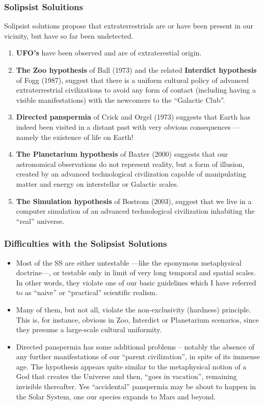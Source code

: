 \begin{frame}
\frametitle{Solipsist Soluitions}

Solipsist solutions propose that extraterrestrials are or have been present in our vicinity, but have so far been undetected. 

\begin{enumerate}
\item {\bf UFO's} have been observed and are of extraterestial origin. 
\item {\bf The Zoo hypothesis} of Ball (1973) and the related {\bf Interdict hypothesis} of Fogg (1987), suggest that there is a uniform cultural policy of advanced extraterrestrial civilizations to avoid any form of contact (including having a visible manifestations) with the newcomers to the ``Galactic Club''.
\item {\bf Directed panspermia} of Crick and Orgel (1973) suggests that Earth has indeed been visited in a distant past with very obvious consequences ---namely the existence of life on Earth! 
\item {\bf The Planetarium hypothesis} of Baxter (2000) suggests that our astronomical observations do not represent reality, but a form of illusion, created by an advanced technological civilization capable of manipulating matter and energy on interstellar or Galactic scales.
\item {\bf The Simulation hypothesis} of Bostrom (2003), suggest that we live in a computer simulation of an advanced technological civilization inhabiting the ``real'' universe.
\end{enumerate}

\end{frame}

\begin{frame}
\frametitle{Difficulties with the Solipsist Solutions}
\begin{itemize}
\item Most of the SS are either untestable ---like the eponymous metaphysical doctrine---, or testable only in limit of very long temporal and spatial scales. In other words, they violate one of our basic guidelines which I have referred to as  ``naive'' or ``practical'' scientific realism.

\item Many of them, but not all, violate the non-exclusivity (hardness) principle. This is, for instance, obvious in Zoo, Interdict or Planetarium scenarios, since they presume a large-scale cultural uniformity.

\item Directed panspermia has some additional problems – notably the absence of any further manifestations of our ``parent civilization'', in spite of its immense age. The hypothesis appears quite similar to the metaphysical notion of a God that creates the Universe and then, ``goes in vacation'', remaining invisible thereafter. Yes ``accidental'' panspermia may be about to happen in the Solar System, one our species expands to Mars and beyond. 
\end{itemize}
\end{frame}

